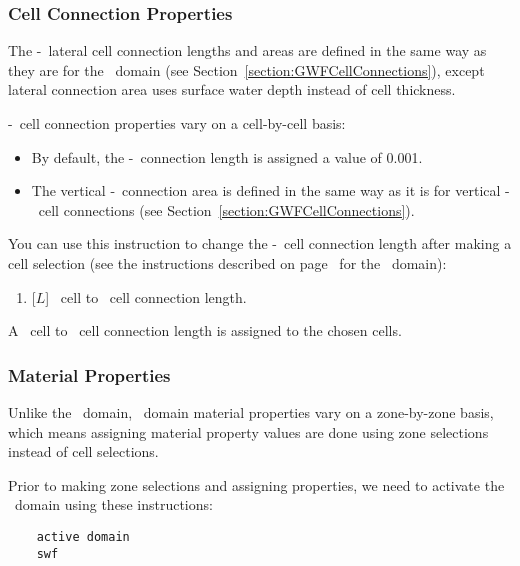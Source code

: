 
\subsubsection{Cell Connection Properties}  

The \swf-\swf\ lateral cell connection lengths and areas are defined in the same way as they are for the \gwf\ domain (see Section~\ref{section:GWFCellConnections}), except lateral connection area uses surface water depth instead of cell thickness.

\swf-\gwf\ cell connection properties vary on a cell-by-cell basis:
\begin{itemize}
     \item By default, the \swf-\gwf\ connection length is assigned a value of 0.001.
     \item The vertical \swf-\gwf\ connection area is defined in the same way as it is for vertical \gwf-\gwf\ cell connections (see Section~\ref{section:GWFCellConnections}).
\end{itemize}

You can use this instruction to change the \swf-\gwf\ cell connection length after making a cell selection (see the instructions described on page~\pageref{page:cellSelect} for the \gwf\ domain):

    {
        \squish
        \begin{enumerate}
        \item {} [$L$] \swf\ cell to \gwf\ cell connection length.
        \end{enumerate}
          A \swf\ cell to \gwf\ cell connection length  is assigned to the chosen cells.
    }

\subsubsection{Material Properties}  
Unlike the \gwf\ domain, \swf\ domain material properties vary on a zone-by-zone basis, which means assigning material property values are done using zone selections instead of cell selections.

%
Prior to making zone selections and assigning properties, we need to activate the \swf\ domain using these instructions:
\begin{verbatim}
    active domain
    swf
\end{verbatim}

